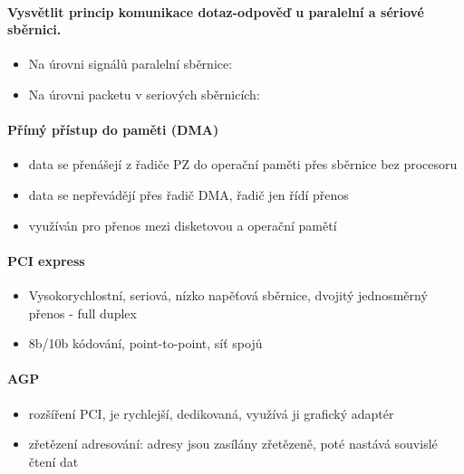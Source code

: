 \documentclass[a5paper,10pt]{article}
\begin{document}
\paragraph{Vysvětlit princip komunikace dotaz-odpověď u paralelní a sériové sběrnici.}
\begin{itemize}
	\item Na úrovni signálů paralelní sběrnice:
	\item Na úrovni packetu v seriových sběrnicích:	
\end{itemize}

\paragraph{Přímý přístup do paměti (DMA)}
\begin{itemize}
	\item data se přenášejí z řadiče PZ do operační paměti přes sběrnice bez procesoru
	\item data se nepřevádějí přes řadič DMA, řadič jen řídí přenos
	\item využíván pro přenos mezi disketovou a operační pamětí	
\end{itemize}

\paragraph{PCI express}
\begin{itemize}
	\item Vysokorychlostní, seriová, nízko napěťová sběrnice, dvojitý jednosměrný přenos - full duplex
	\item 8b/10b kódování, point-to-point, síť spojů	
\end{itemize}

\paragraph{AGP}
\begin{itemize}
	\item rozšíření PCI, je rychlejší, dedikovaná, využívá ji grafický adaptér
	\item zřetězení adresování: adresy jsou zasílány zřetězeně, poté nastává souvislé čtení dat	
\end{itemize}
\end{document}

